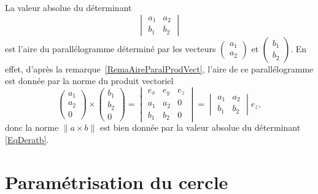 La valeur absolue du déterminant
\begin{equation}        \label{EqDeratb}
	\begin{vmatrix}
		a_1 & a_2 \\
		b_1 & b_2
	\end{vmatrix}
\end{equation}
est l'aire du parallélogramme déterminé par les vecteurs \( \begin{pmatrix}
	a_1 \\
	a_2
\end{pmatrix}\) et \( \begin{pmatrix}
	b_1 \\
	b_2
\end{pmatrix}\). En effet, d'après la remarque~\ref{RemaAireParalProdVect}, l'aire de ce parallélogramme est donnée par la norme du produit vectoriel
\begin{equation}
	\begin{pmatrix}
		a_1 \\
		a_2 \\
		0
	\end{pmatrix}\times
	\begin{pmatrix}
		b_1 \\
		b_2 \\
		0
	\end{pmatrix}=\begin{vmatrix}
		e_x & e_y & e_z \\
		a_1 & a_2 & 0   \\
		b_1 & b_2 & 0
	\end{vmatrix}=
	\begin{vmatrix}
		a_1 & a_2 \\
		b_1 & b_2
	\end{vmatrix}e_z,
\end{equation}
donc la norme \( \| a\times b \|\) est bien donnée par la valeur absolue du déterminant \eqref{EqDeratb}.

\section{Paramétrisation du cercle}

